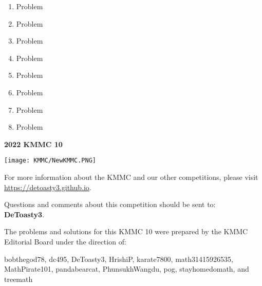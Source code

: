 \documentclass[10pt, twoside]{article}
\newcommand{\theYear}{2022}
\newcommand{\contestNumber}{10}
\newcommand{\contestName}{KMMC}
\begin{document}
\begin{justify}
\begin{enumerate}[itemsep=3.76389mm]
\ans{}{}{}{}{}

\item Problem

\ans{}{}{}{}{}

\item Problem

\ans{}{}{}{}{}

\item Problem

\ans{}{}{}{}{}

\item Problem

\ans{}{}{}{}{}

\item Problem

\ans{}{}{}{}{}

\item Problem

\ans{}{}{}{}{}

\item Problem

\ans{}{}{}{}{}

\item Problem

\ans{}{}{}{}{}
\end{enumerate}

\newpage
\thispagestyle{empty}
\begin{center}\textsf{\textbf{\huge {\theYear} {\contestName} {\contestNumber}}} \end{center}
\vspace{-6mm}
\begin{center} \noindent\hrulefill \end{center}
\vspace{-3mm}
\begin{center} \texttt{[image: KMMC/NewKMMC.PNG]}
\end{center}
\vspace{-5mm}
\begin{center}
For more information about the {\contestName} and our other competitions, please visit \url{https://detoasty3.github.io}. 
\end{center}
\begin{center} Questions and comments about this competition should be sent to:  
\vspace{4mm}
\\ \textbf{DeToasty3}.\end{center}
\begin{center}The problems and solutions for this {\contestName} {\contestNumber} were prepared by the {\contestName} Editorial Board under the direction of:\end{center}
\vspace{-3.5mm}
\begin{center}
bobthegod78, dc495, DeToasty3, HrishiP, karate7800, math31415926535, MathPirate101, pandabearcat, PhunsukhWangdu, pog, stayhomedomath, and treemath\end{center}
\end{justify}
\end{document}
